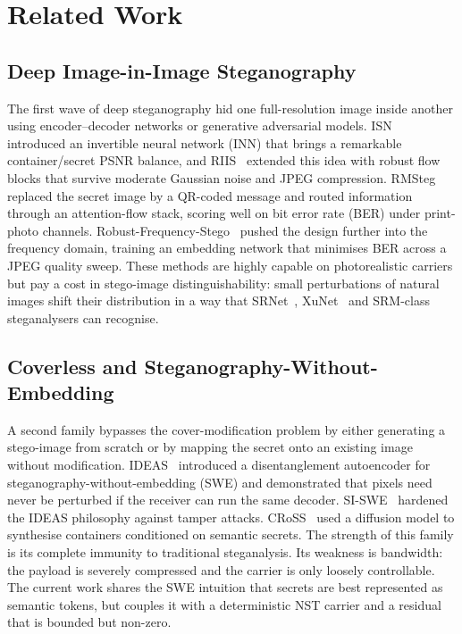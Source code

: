 \documentclass[conference]{IEEEtran}
\begin{document}
\section{Related Work}

\subsection{Deep Image-in-Image Steganography}
The first wave of deep steganography hid one full-resolution image inside another using encoder--decoder networks or generative adversarial models. ISN~\cite{isn} introduced an invertible neural network (INN) that brings a remarkable container/secret PSNR balance, and RIIS~\cite{riis} extended this idea with robust flow blocks that survive moderate Gaussian noise and JPEG compression. RMSteg~\cite{rmsteg} replaced the secret image by a QR-coded message and routed information through an attention-flow stack, scoring well on bit error rate (BER) under print-photo channels. Robust-Frequency-Stego~\cite{rfs2023} pushed the design further into the frequency domain, training an embedding network that minimises BER across a JPEG quality sweep. These methods are highly capable on photorealistic carriers but pay a cost in stego-image distinguishability: small perturbations of natural images shift their distribution in a way that SRNet~\cite{srnet}, XuNet~\cite{xunet} and SRM-class~\cite{srm} steganalysers can recognise.

\subsection{Coverless and Steganography-Without-Embedding}
A second family bypasses the cover-modification problem by either generating a stego-image from scratch or by mapping the secret onto an existing image without modification. IDEAS~\cite{ideas2022} introduced a disentanglement autoencoder for steganography-without-embedding (SWE) and demonstrated that pixels need never be perturbed if the receiver can run the same decoder. SI-SWE~\cite{siswe2023} hardened the IDEAS philosophy against tamper attacks. CRoSS~\cite{cross} used a diffusion model to synthesise containers conditioned on semantic secrets. The strength of this family is its complete immunity to traditional steganalysis. Its weakness is bandwidth: the payload is severely compressed and the carrier is only loosely controllable. The current work shares the SWE intuition that secrets are best represented as semantic tokens, but couples it with a deterministic NST carrier and a residual that is bounded but non-zero.
\end{document}
